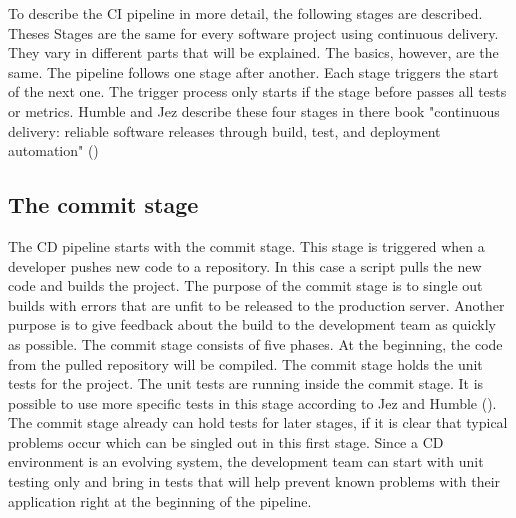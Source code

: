 To describe the CI pipeline in more detail, the following stages are described. Theses Stages are the same for every software project using
continuous delivery. They vary in different parts that will be explained. The basics, however, are the same. The pipeline follows one stage after another.
Each stage triggers the start of the next one. The trigger process only starts if the stage before passes all tests or metrics.
Humble and Jez describe these four stages in there book "continuous delivery: reliable software releases through build,
test, and deployment automation" (\cite{humble2010continuous})

\subsection{The commit stage}
The CD pipeline starts with the commit stage. This stage is triggered when a developer pushes new code to a repository.
In this case a script pulls the new code and builds the project. The purpose of the commit stage is to single out builds with errors that
are unfit to be released to the production server.  Another purpose is to give feedback about the build to the development team as quickly as possible.
The commit stage consists of five phases. At the beginning, the code from the pulled repository will be compiled. The commit stage holds the unit
tests for the project. The unit tests are running inside the commit stage. It is possible to use more specific tests in this stage according to Jez and Humble
(\cite{humble2010continuous}). The commit stage already can hold tests for later stages, if it is clear that typical problems occur which can be singled out in this first stage. Since a CD environment is an evolving system, the development team can start with unit testing only and bring in tests
that will help prevent known problems with their application right at the beginning of the pipeline.

